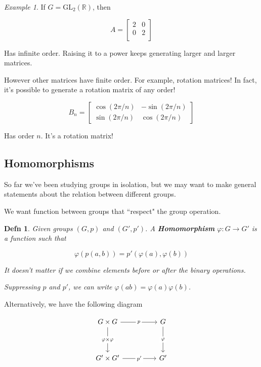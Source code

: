 \documentclass[12pt]{article}
\def\gl{\text{GL}}
\def\R{{\mathbb R}}
\newtheorem{definition}{Defn}
\theoremstyle{remark}
\theoremstyle{remark}
\theoremstyle{remark}
\newtheorem{example}{Example}
\theoremstyle{remark}
\theoremstyle{remark}
\begin{document}
\begin{example}
	If $G = \gl_2(\R)$, then

	\[
		A = \begin{bmatrix}
			2 & 0 \\
			0 & 2 \\
		\end{bmatrix}
	\]

	Has infinite order. Raising it to a power keeps generating larger and larger
	matrices.

	However other matrices have finite order. For example, rotation matrices! In
	fact, it's possible to generate a rotation matrix of any order!

	\[
		B_n = \begin{bmatrix}
			\cos(2 \pi / n) & -\sin(2 \pi / n) \\
			\sin(2 \pi / n) & \cos(2 \pi / n)
		\end{bmatrix}
	\]

	Has order $n$. It's a rotation matrix!
\end{example}

\subsection{Homomorphisms}

So far we've been studying groups in isolation, but we may want to make general
statements about the relation between different groups.

We want function between groups that ``respect" the group operation.

\begin{definition}
	Given groups $(G, p)$ and $(G', p')$. A {\bf Homomorphism} $\varphi: G \to G'$
	is a function such that

	\[
		\varphi(p(a, b)) = p'(\varphi(a), \varphi(b))
	\]

	It doesn't matter if we combine elements before or after the binary
	operations.

	Suppressing $p$ and $p'$, we can write $\varphi(ab) = \varphi(a) \varphi(b)$.
\end{definition}

Alternatively, we have the following diagram

\[
	\begin{tikzcd}
		{G \times G} && G \\
		\\
		{G' \times G'} && {G'}
		\arrow["{\varphi \times \varphi}"{description}, from=1-1, to=3-1]
		\arrow["p"{description}, from=1-1, to=1-3]
		\arrow["{p'}"{description}, from=3-1, to=3-3]
		\arrow["\varphi"{description}, from=1-3, to=3-3]
	\end{tikzcd}
\]
\end{document}

